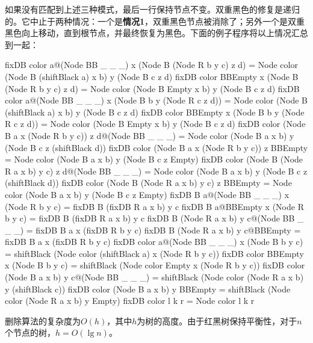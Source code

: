 \documentclass[b5paper]{ctexart}
\begin{document}
如果没有匹配到上述三种模式，最后一行保持节点不变。双重黑色的修复是递归的。它中止于两种情况：一个是\textbf{情况1}，双重黑色节点被消除了；另外一个是双重黑色向上移动，直到根节点，并最终恢复为黑色。下面的例子程序将以上情况汇总到一起：

\begin{Haskell}
fixDB color a@(Node BB _ _ _) x (Node B (Node R b y c) z d)
      = Node color (Node B (shiftBlack a) x b) y (Node B c z d)
fixDB color BBEmpty x (Node B (Node R b y c) z d)
      = Node color (Node B Empty x b) y (Node B c z d)
fixDB color a@(Node BB _ _ _) x (Node B b y (Node R c z d))
      = Node color (Node B (shiftBlack a) x b) y (Node B c z d)
fixDB color BBEmpty x (Node B b y (Node R c z d))
      = Node color (Node B Empty x b) y (Node B c z d)
fixDB color (Node B a x (Node R b y c)) z d@(Node BB _ _ _)
      = Node color (Node B a x b) y (Node B c z (shiftBlack d))
fixDB color (Node B a x (Node R b y c)) z BBEmpty
      = Node color (Node B a x b) y (Node B c z Empty)
fixDB color (Node B (Node R a x b) y c) z d@(Node BB _ _ _)
      = Node color (Node B a x b) y (Node B c z (shiftBlack d))
fixDB color (Node B (Node R a x b) y c) z BBEmpty
      = Node color (Node B a x b) y (Node B c z Empty)
fixDB B a@(Node BB _ _ _) x (Node R b y c)
      = fixDB B (fixDB R a x b) y c
fixDB B a@BBEmpty x (Node R b y c)
      = fixDB B (fixDB R a x b) y c
fixDB B (Node R a x b) y c@(Node BB _ _ _)
      = fixDB B a x (fixDB R b y c)
fixDB B (Node R a x b) y c@BBEmpty
      = fixDB B a x (fixDB R b y c)
fixDB color a@(Node BB _ _ _) x (Node B b y c)
      = shiftBlack (Node color (shiftBlack a) x (Node R b y c))
fixDB color BBEmpty x (Node B b y c)
      = shiftBlack (Node color Empty x (Node R b y c))
fixDB color (Node B a x b) y c@(Node BB _ _ _)
      = shiftBlack (Node color (Node R a x b) y (shiftBlack c))
fixDB color (Node B a x b) y BBEmpty
      = shiftBlack (Node color (Node R a x b) y Empty)
fixDB color l k r = Node color l k r
\end{Haskell}

删除算法的复杂度为$O(h)$，其中$h$为树的高度。由于红黑树保持平衡性，对于$n$个节点的树，$h = O(\lg n)$。

\begin{Exercise}\label{ex:mark-rebuild}
\end{Exercise}
\end{document}
